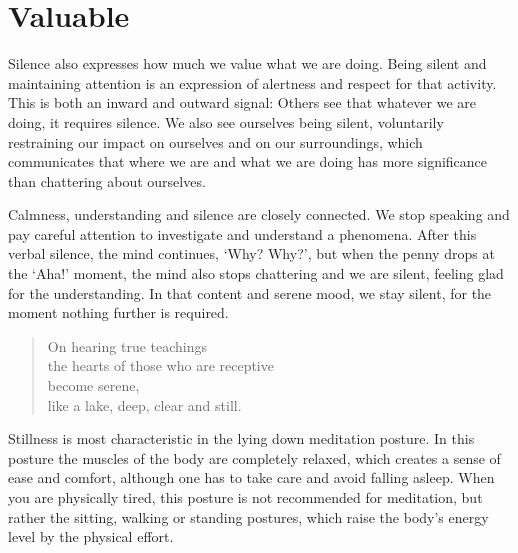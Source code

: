 \section{Valuable}


Silence also expresses how much we value what we are doing. Being silent
and maintaining attention is an expression of alertness and respect for
that activity. This is both an inward and outward signal: Others see
that whatever we are doing, it requires silence. We also see ourselves
being silent, voluntarily restraining our impact on ourselves and on our
surroundings, which communicates that where we are and what we are doing
has more significance than chattering about ourselves.

Calmness, understanding and silence are closely connected. We stop
speaking and pay careful attention to investigate and understand a
phenomena. After this verbal silence, the mind continues, `Why? Why?',
but when the penny drops at the `Aha!' moment, the mind also stops
chattering and we are silent, feeling glad for the understanding. In
that content and serene mood, we stay silent, for the moment nothing
further is required.

\begin{quote}
On hearing true teachings\\
the hearts of those who are receptive\\
become serene,\\
like a lake, deep, clear and still.

\bigskip

\end{quote}


Stillness is most characteristic in the lying down meditation posture.
In this posture the muscles of the body are completely relaxed, which
creates a sense of ease and comfort, although one has to take care and
avoid falling asleep. When you are physically tired, this posture is not
recommended for meditation, but rather the sitting, walking or standing
postures, which raise the body's energy level by the physical effort.

